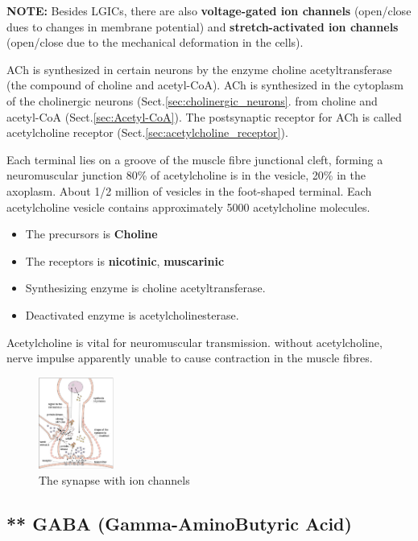 {\bf NOTE:} Besides LGICs, there are also {\bf voltage-gated ion channels}
(open/close dues to changes in membrane potential) and {\bf  stretch-activated
ion channels} (open/close due to the mechanical deformation in the cells).

ACh is synthesized in certain neurons by the enzyme choline acetyltransferase
(the compound of choline and acetyl-CoA).
ACh is synthesized in the cytoplasm of the cholinergic neurons
(Sect.\ref{sec:cholinergic_neurons}.
from choline and acetyl-CoA (Sect.\ref{sec:Acetyl-CoA}). The postsynaptic
receptor for ACh is called acetylcholine receptor
(Sect.\ref{sec:acetylcholine_receptor}).

Each terminal lies on a groove of the muscle fibre junctional cleft, forming a
neuromuscular junction 80\% of acetylcholine is in the vesicle, 20\% in the
axoplasm. About 1/2 million of vesicles in the foot-shaped terminal. Each
acetylcholine vesicle contains approximately 5000 acetylcholine molecules.

\begin{itemize}
\item The precursors is {\bf Choline}
\item The receptors is {\bf nicotinic}, {\bf muscarinic}
\item Synthesizing enzyme is choline acetyltransferase.
\item Deactivated enzyme is acetylcholinesterase.
\end{itemize}

Acetylcholine is vital for neuromuscular transmission.
without acetylcholine, nerve impulse apparently unable to cause contraction in
the muscle fibres.

\begin{figure}[htb]
  \centerline{\includegraphics[height=3cm]{./images/synapse-ion_channel.eps}}
  \caption{The synapse with ion channels}\label{fig:synapse_ion-channel}
\end{figure}


\subsection{** GABA (Gamma-AminoButyric Acid)}
\label{sec:GABA}

